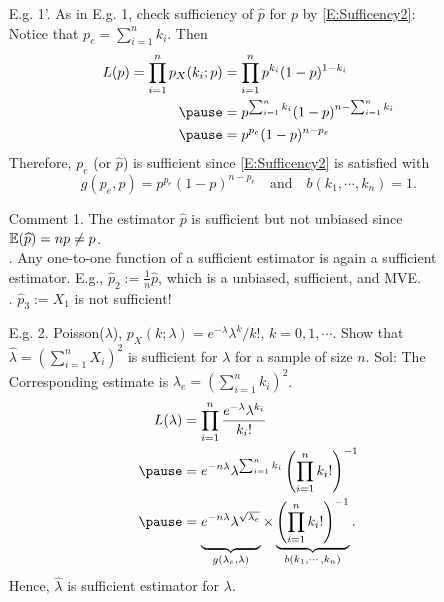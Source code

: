 \begin{frame}
\begin{enumerate}
 \item[E.g. 1'.] As in E.g. 1, check sufficiency of $\widehat p$ for $p$ by \eqref{E:Sufficency2}:\\[1em] \pause
Notice that $p_e=\sum_{i=1}^n k_i$. Then \pause
 \begin{align*}
 L( p) = \prod_{i=1}^n p_X(k_i;p) &= \prod_{i=1}^n p^{k_i}(1-p)^{1-k_i}\\ \pause
 &=p^{\sum_{i=1}^n k_i} (1-p)^{n -\sum_{i=1}^n k_i}\\ \pause
 &=p^{p_e} (1-p)^{n -p_e}
\end{align*}
\pause
Therefore, $p_e$ (or $\widehat p$) is sufficient since \eqref{E:Sufficency2} is satisfied with
\[
g(p_e,p) = p^{p_e} (1-p)^{n -p_e} \quad \text{and}\quad b(k_1,\cdots,k_n) =1.
\] \pause
\vfill
\item[Comment] 1. The estimator $\widehat p$ is sufficient but not unbiased since $\mathbb{E}(\widehat p) = n p \ne p$. \\[0.5em]. Any one-to-one function of a sufficient estimator is again a sufficient estimator. E.g., $\widehat p_2:= \frac{1}{n} \widehat p$, which is a unbiased, sufficient, and MVE. \\[0.5em]. $\widehat p_3:= X_1$ is not sufficient!
\end{enumerate}
\end{frame}
\begin{frame}
 \begin{enumerate}
  \item[E.g. 2.] Poisson($\lambda$), $p_X(k;\lambda) =e^{-\lambda}\lambda^k/k!$, $k=0,1,\cdots$. Show that $\widehat\lambda=(\sum_{i=1}^n X_i)^2$ is sufficient for $\lambda$ for a sample of size $n$. \pause
  \vfill
  Sol: The Corresponding estimate is $\lambda_e=(\sum_{i=1}^n k_i)^2$.\pause
  \begin{align*}
   L(\lambda) &= \prod_{i=1}^n \frac{e^{-\lambda}\lambda^{k_i}}{k_i!} \\ \pause
   & = e^{-n\lambda} \lambda^{\sum_{i=1}^n k_i} \left(\prod_{i=1}^n k_i!\right)^{-1}\\ \pause
   & = \underbrace{\mystrut{1.3em} e^{-n\lambda} \lambda^{\sqrt{\lambda_e} }}_{g(\lambda_e,\lambda)} \times \underbrace{\left(\prod_{i=1}^n k_i!\right)^{-1}}_{b(k_1,\cdots,k_n)}.
  \end{align*}\pause
  Hence, $\widehat\lambda$ is sufficient estimator for $\lambda$.\myEnd
  \end{enumerate}
\end{frame}
